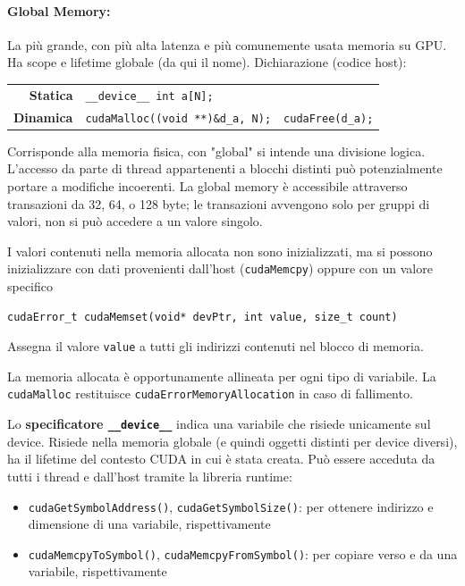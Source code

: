 \paragraph{Global Memory:} La più grande, con più alta latenza e più comunemente usata memoria su GPU. Ha scope e lifetime globale (da qui il nome). Dichiarazione (codice host):
\begin{center}
	\begin{tabular}{r | l r | }
		\cline{2-3}
		\textbf{Statica} & \texttt{\_\_device\_\_ int a[N];} & \\
		\textbf{Dinamica} & \texttt{cudaMalloc((void **)\&d\_a, N);} & \texttt{cudaFree(d\_a);} \\
		\cline{2-3}
	\end{tabular}
\end{center}

Corrisponde alla memoria fisica, con "global" si intende una divisione logica. L'accesso da parte di thread appartenenti a blocchi distinti può potenzialmente portare a modifiche incoerenti. La global memory è accessibile attraverso transazioni da 32, 64, o 128 byte; le transazioni avvengono solo per gruppi di valori, non si può accedere a un valore singolo.

I valori contenuti nella memoria allocata non sono inizializzati, ma si possono inizializzare con dati provenienti dall'host (\texttt{cudaMemcpy}) oppure con un valore specifico
\begin{verbatim}
cudaError_t cudaMemset(void* devPtr, int value, size_t count)
\end{verbatim}

Assegna il valore \texttt{value} a tutti gli indirizzi contenuti nel blocco di memoria.

La memoria allocata è opportunamente allineata per ogni tipo di variabile. La \texttt{cudaMalloc} restituisce \texttt{cudaErrorMemoryAllocation} in caso di fallimento.

Lo \textbf{specificatore \texttt{\_\_device\_\_}} indica una variabile che risiede unicamente sul device. Risiede nella memoria globale (e quindi oggetti distinti per device diversi), ha il lifetime del contesto CUDA in cui è stata creata. Può essere acceduta da tutti i thread e dall'host tramite la libreria runtime:
\begin{itemize}
	\item \texttt{cudaGetSymbolAddress()}, \texttt{cudaGetSymbolSize()}: per ottenere indirizzo e dimensione di una variabile, rispettivamente
	
    \item \texttt{cudaMemcpyToSymbol()}, \texttt{cudaMemcpyFromSymbol()}: per copiare verso e da una variabile, rispettivamente
\end{itemize}

